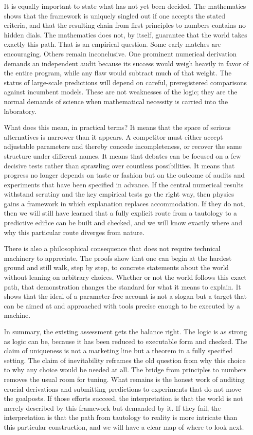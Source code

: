\documentclass[12pt]{article}
\begin{document}
It is equally important to state what has not yet been decided. The mathematics shows that the framework is uniquely singled out if one accepts the stated criteria, and that the resulting chain from first principles to numbers contains no hidden dials. The mathematics does not, by itself, guarantee that the world takes exactly this path. That is an empirical question. Some early matches are encouraging. Others remain inconclusive. One prominent numerical derivation demands an independent audit because its success would weigh heavily in favor of the entire program, while any flaw would subtract much of that weight. The status of large-scale predictions will depend on careful, preregistered comparisons against incumbent models. These are not weaknesses of the logic; they are the normal demands of science when mathematical necessity is carried into the laboratory.

What does this mean, in practical terms? It means that the space of serious alternatives is narrower than it appears. A competitor must either accept adjustable parameters and thereby concede incompleteness, or recover the same structure under different names. It means that debates can be focused on a few decisive tests rather than sprawling over countless possibilities. It means that progress no longer depends on taste or fashion but on the outcome of audits and experiments that have been specified in advance. If the central numerical results withstand scrutiny and the key empirical tests go the right way, then physics gains a framework in which explanation replaces accommodation. If they do not, then we will still have learned that a fully explicit route from a tautology to a predictive edifice can be built and checked, and we will know exactly where and why this particular route diverges from nature.

There is also a philosophical consequence that does not require technical machinery to appreciate. The proofs show that one can begin at the hardest ground and still walk, step by step, to concrete statements about the world without leaning on arbitrary choices. Whether or not the world follows this exact path, that demonstration changes the standard for what it means to explain. It shows that the ideal of a parameter-free account is not a slogan but a target that can be aimed at and approached with tools precise enough to be executed by a machine.

In summary, the existing assessment gets the balance right. The logic is as strong as logic can be, because it has been reduced to executable form and checked. The claim of uniqueness is not a marketing line but a theorem in a fully specified setting. The claim of inevitability reframes the old question from why this choice to why any choice would be needed at all. The bridge from principles to numbers removes the usual room for tuning. What remains is the honest work of auditing crucial derivations and submitting predictions to experiments that do not move the goalposts. If those efforts succeed, the interpretation is that the world is not merely described by this framework but demanded by it. If they fail, the interpretation is that the path from tautology to reality is more intricate than this particular construction, and we will have a clear map of where to look next.
\end{document}
